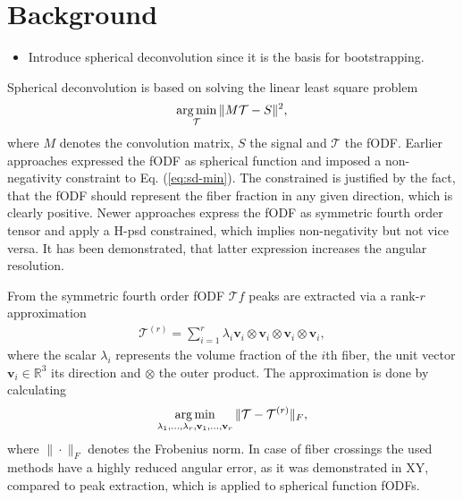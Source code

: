 \section{Background}
\begin{itemize}
	\item Introduce spherical deconvolution since it is the basis for
		bootstrapping. 

\end{itemize}
Spherical deconvolution is based on solving the linear least square problem 
\begin{align}
	\operatorname*{arg\,min}_{\mathcal{T}} \| M \mathcal{T} - S \|^2,
	\label{eq:sd-min}
\end{align}
where 
$M$ denotes the convolution matrix, $S$ the signal and $\mathcal{T}$ the fODF.
Earlier approaches expressed the fODF as spherical function and imposed a
non-negativity constraint to Eq. (\ref{eq:sd-min}). The constrained is justified by
the fact, that the fODF should represent the fiber fraction in any given
direction, which is clearly positive. 
Newer approaches express the fODF as symmetric fourth order tensor and apply a
H-psd constrained, which implies non-negativity but not vice versa. It has been
demonstrated, that latter expression increases the angular resolution. 

From the symmetric fourth order fODF $\mathcal{T}f$ peaks are extracted via a rank-$r$
approximation 
\begin{align}
	\mathcal{T}^{\left( r \right)} = \sum_{i=1}^r \lambda_i \mathbf{v}_i
	\otimes \mathbf{v}_i \otimes \mathbf{v}_i \otimes \mathbf{v}_i, 
	\label{eq:low-rank}
\end{align}
where the scalar $\lambda_i$ represents the volume fraction of the $i$th fiber,
the unit vector $\mathbf{v}_i \in \mathbb{R}^3$ its direction and $\otimes$ the
outer product. The approximation is done by calculating 
\[ \operatorname*{arg\,min}_{\lambda_1, \dots , \lambda_r , \mathbf{v}_1, \dots , \mathbf{v}_r}
\| \mathcal{T} - \mathcal{T}^{\left( r \right)} \|_F, \]
where $\| \cdot \|_F$ denotes the Frobenius norm. In case of fiber crossings the
used methods have a highly reduced angular error, as it was demonstrated in XY,
compared to peak extraction, which is applied to spherical function fODFs. 



